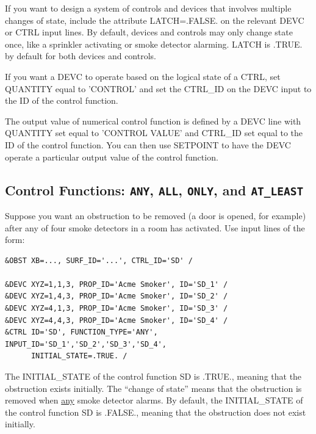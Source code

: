 \documentclass[11pt]{book}
\begin{document}
If you want to design a system of controls and devices that involves multiple changes of state, include the attribute {\ct LATCH=.FALSE.} on the relevant {\ct DEVC} or {\ct CTRL} input lines. By default, devices and controls may only change state once, like a sprinkler activating or smoke detector alarming. {\ct LATCH} is {\ct .TRUE.} by default for both devices and controls.

If you want a {\ct DEVC} to operate based on the logical state of a {\ct CTRL}, set {\ct QUANTITY} equal to {\ct 'CONTROL'} and set the {\ct CTRL\_ID} on the {\ct DEVC} input to the {\ct ID} of the control function.

The output value of numerical control function is defined by a {\ct DEVC} line with {\ct QUANTITY} set equal to {\ct 'CONTROL VALUE'} and {\ct CTRL\_ID} set equal to the {\ct ID} of the control function.  You can then use {\ct SETPOINT} to have the {\ct DEVC} operate a particular output value of the control function.


\subsection{Control Functions: \texorpdfstring{{\tt ANY}}{ANY}, \texorpdfstring{{\tt ALL}}{ALL}, \texorpdfstring{{\tt ONLY}}{ONLY}, and
\texorpdfstring{{\tt AT\_LEAST}}{AT\_LEAST}}

\label{info:FUNCTION_TYPE}

Suppose you want an obstruction to be removed (a door is opened, for example) after any of four smoke detectors in a room has activated. Use input lines of the form:
\begin{lstlisting}
&OBST XB=..., SURF_ID='...', CTRL_ID='SD' /

&DEVC XYZ=1,1,3, PROP_ID='Acme Smoker', ID='SD_1' /
&DEVC XYZ=1,4,3, PROP_ID='Acme Smoker', ID='SD_2' /
&DEVC XYZ=4,1,3, PROP_ID='Acme Smoker', ID='SD_3' /
&DEVC XYZ=4,4,3, PROP_ID='Acme Smoker', ID='SD_4' /
&CTRL ID='SD', FUNCTION_TYPE='ANY', INPUT_ID='SD_1','SD_2','SD_3','SD_4',
      INITIAL_STATE=.TRUE. /
\end{lstlisting}
The {\ct INITIAL\_STATE} of the control function {\ct SD} is {\ct .TRUE.}, meaning that the obstruction exists initially. The ``change of state'' means that the obstruction is removed when \underline{any} smoke detector alarms.  By default, the {\ct INITIAL\_STATE} of the control function {\ct SD} is {\ct .FALSE.}, meaning that the obstruction does not exist initially.
\end{document}
